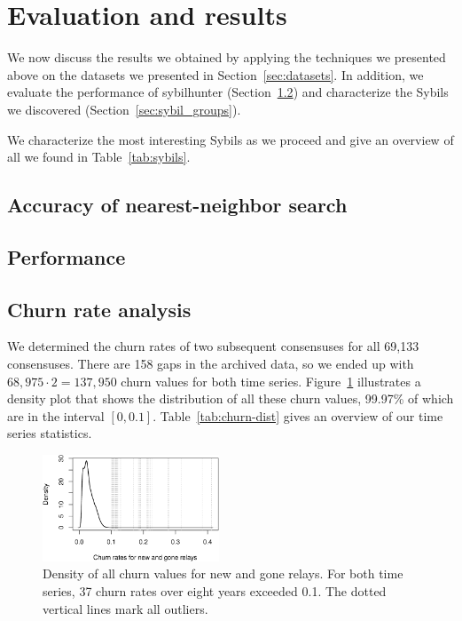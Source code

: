\section{Evaluation and results}
\label{sec:results}
We now discuss the results we obtained by applying the techniques we presented
above on the datasets we presented in Section~\ref{sec:datasets}.  In addition,
we evaluate the performance of sybilhunter (Section~\ref{sec:performance}) and
characterize the Sybils we discovered (Section~\ref{sec:sybil_groups}).

We characterize the most interesting Sybils as we proceed and give an overview
of all we found in Table~\ref{tab:sybils}.

\subsection{Accuracy of nearest-neighbor search}


\subsection{Performance}
\label{sec:performance}


\subsection{Churn rate analysis}
We determined the churn rates of two subsequent consensuses for all 69,133
consensuses.  There are 158 gaps in the archived data, so we ended up with
$68,975 \cdot 2 = 137,950$ churn values for both time series.
Figure~\ref{fig:churn-density} illustrates a density plot that shows the
distribution of all these churn values, 99.97\% of which are in the interval
$[0, 0.1]$.  Table~\ref{tab:churn-dist} gives an overview of our time series
statistics.

\begin{figure}[t]
	\centering
	\includegraphics[width=0.47\textwidth]{diagrams/churn-density.pdf}
	\caption{Density of all churn values for new and gone relays.  For both
	time series, 37 churn rates over eight years exceeded 0.1.  The dotted
	vertical lines mark all outliers.}
	\label{fig:churn-density}
\end{figure}

